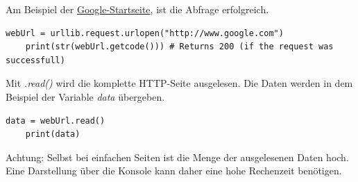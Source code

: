 Am Beispiel der \href{http://www.google.com}{Google-Startseite}, ist die Abfrage erfolgreich.
\begin{lstlisting}[style=python]
	webUrl = urllib.request.urlopen("http://www.google.com")
	print(str(webUrl.getcode())) # Returns 200 (if the request was successfull)
\end{lstlisting}

Mit \textit{.read()} wird die komplette \gls{HTTP}-Seite ausgelesen. Die Daten werden in dem Beispiel der Variable \textit{data} übergeben.
\begin{lstlisting}[style=python]
	data = webUrl.read()
	print(data)
\end{lstlisting}
Achtung: Selbst bei einfachen Seiten ist die Menge der ausgelesenen Daten hoch. Eine Darstellung über die Konsole kann daher eine hohe Rechenzeit benötigen.

